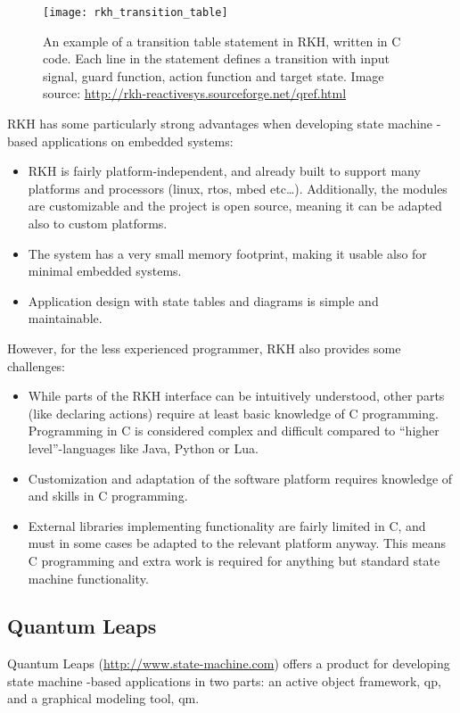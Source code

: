 \begin{figure}[h]
	\centering
	\texttt{[image: rkh\_transition\_table]}
	\caption[A transition table statement in RKH]{An example of a transition table statement in RKH, written in C code. Each line in the statement defines a transition with input signal, guard function, action function and target state. Image source: \url{http://rkh-reactivesys.sourceforge.net/qref.html} \label{figure:rkh_transition} }
\end{figure}

RKH has some particularly strong advantages when developing state machine -based applications on embedded systems:
\begin{itemize}
\item RKH is fairly platform-independent, and already built to support many platforms and processors (linux, \gls{rtos}, mbed etc…). Additionally, the modules are customizable and the project is open source, meaning it can be adapted also to custom platforms.
\item The system has a very small memory footprint, making it usable also for minimal embedded systems.
\item Application design with state tables and diagrams is simple and maintainable.
\end{itemize}

However, for the less experienced programmer, RKH also provides some challenges:
\begin{itemize}
	\item While parts of the RKH interface can be intuitively understood, other parts (like declaring actions) require at least basic knowledge of C programming. Programming in C is considered complex and difficult compared to ``higher level''-languages like Java, Python or Lua.
	\item Customization and adaptation of the software platform requires knowledge of and skills in C programming.
	\item External libraries implementing functionality are fairly limited in C, and must in some cases be adapted to the relevant platform anyway. This means C programming and extra work is required for anything but standard state machine functionality.
\end{itemize}

\subsection{Quantum Leaps}
\label{sec:quantum_leaps}
Quantum Leaps (\url{http://www.state-machine.com}) offers a product for developing state machine -based applications in two parts: an active object framework, \gls{qp}, and a graphical modeling tool, \gls{qm}.

